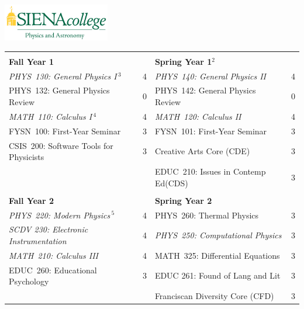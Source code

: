 \documentclass[12pt]{article}
\begin{document}
\hfill \includegraphics[width=0.35\textwidth]{siena_phys_astro_print_crop.jpg}

\vspace{0.1cm}
\vspace{0.3cm}

\vspace*{-5mm}
\begin{table}[h!]
\begin{center}
{\renewcommand{\arraystretch}{1.2}
\begin{tabular*}{0.9\textwidth}{@{\extracolsep{\fill}}lclc}
 & \\
{\Large \textbf{Fall Year 1}} & & {\Large \textbf{Spring Year 1$^{2}$}} & \\
\hline
{\em PHYS~130: General Physics I}\,$^{3}$  & 4 & {\em PHYS~140: General Physics II}     & 4 \\
PHYS~132: General Physics Review           & 0 & PHYS~142: General Physics Review & 0\\
{\em MATH~110: Calculus I}\,$^{4}$         & 4 & {\em MATH~120: Calculus II}            & 4 \\
FYSN~100: First-Year Seminar               & 3 & FYSN~101: First-Year Seminar     & 3\\
CSIS~200: Software Tools for Physicists    & 3 & Creative Arts Core (CDE)         & 3 \\
								& & EDUC~210: Issues in Contemp Ed(CDS) & 3\\

 & \\
{\Large \textbf{Fall Year 2}} & & {\Large \textbf{Spring Year 2}} & \\
\hline
{\em PHYS~220: Modern Physics}\,$^{5}$      & 4 & PHYS~260: Thermal Physics        & 3 \\
{\em SCDV 230: Electronic Instrumentation} & 4 & {\em PHYS~250: Computational Physics} & 3  \\
{\em MATH~210: Calculus III}               & 4 & MATH~325: Differential Equations & 3 \\
EDUC~260: Educational Psychology                        & 3 & EDUC 261: Found of Lang and Lit &3 \\
                                           &   & Franciscan Diversity Core (CFD)  & 3 \\


\end{tabular*}}
\end{center}
\end{table}
\end{document}
